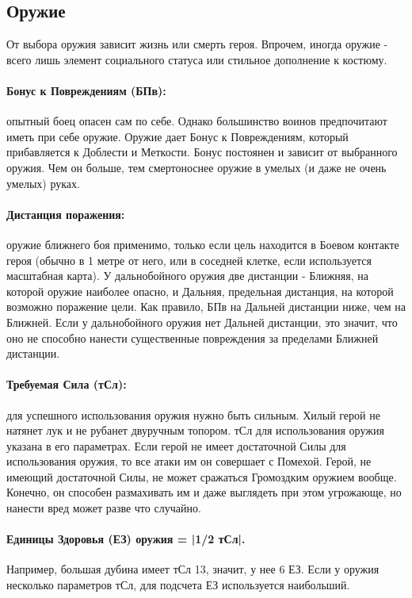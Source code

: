 \subsection{Оружие}
От выбора оружия зависит жизнь или смерть героя. Впрочем, иногда оружие - всего лишь элемент социального статуса или стильное дополнение к костюму.
\paragraph{Бонус к Повреждениям (БПв):} опытный боец опасен сам по себе. Однако большинство воинов предпочитают иметь при себе оружие. Оружие дает Бонус к Повреждениям, который прибавляется к Доблести и Меткости. Бонус постоянен и зависит от выбранного оружия. Чем он больше, тем смертоноснее оружие в умелых (и даже не очень умелых) руках.

\paragraph{Дистанция поражения:} оружие ближнего боя применимо, только если цель находится в Боевом контакте героя  (обычно в 1 метре от него, или в соседней клетке, если используется масштабная карта).
\newline У дальнобойного оружия две дистанции - Ближняя, на которой оружие наиболее опасно, и Дальняя, предельная дистанция, на которой возможно поражение цели. Как правило, БПв на Дальней дистанции ниже, чем на Ближней.
\newline Если у дальнобойного оружия нет Дальней дистанции, это значит, что оно не способно нанести существенные повреждения за пределами Ближней дистанции.

\paragraph{Требуемая Сила (тСл):} для успешного использования оружия нужно быть сильным. Хилый герой не натянет лук и не рубанет двуручным топором. тСл для использования оружия указана в его параметрах. Если герой не имеет достаточной Силы для использования оружия, то все атаки им он совершает с Помехой. Герой, не имеющий достаточной Силы, не может сражаться Громоздким оружием вообще. Конечно, он способен размахивать им и даже выглядеть при этом угрожающе, но нанести вред может разве что случайно.

\paragraph{Единицы Здоровья (ЕЗ) оружия = |1/2 тСл|.} Например, большая дубина имеет тСл 13, значит, у нее 6 ЕЗ. Если у оружия несколько параметров тСл, для подсчета ЕЗ используется наибольший.

